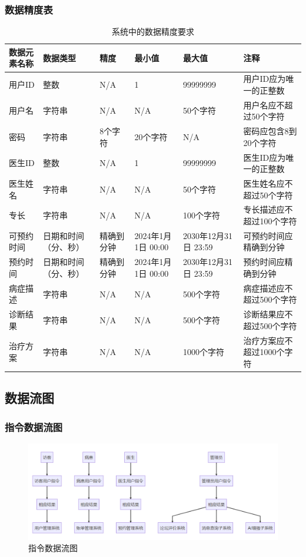\subsubsection{数据精度表}
\begin{table}[htbp]
	\centering
	\begin{tabular}{|l|p{2cm}|p{2cm}|p{2cm}|p{2cm}|p{3cm}|}
		\hline
		\textbf{数据元素名称} & \textbf{数据类型} & \textbf{精度} & \textbf{最小值} & \textbf{最大值} & \textbf{注释} \\
		\hline
		用户ID & 整数 & N/A & 1 & 99999999 & 用户ID应为唯一的正整数 \\
		用户名 & 字符串 & N/A & N/A & 50个字符 & 用户名应不超过50个字符 \\
		密码 & 字符串 & 8个字符 & 20个字符 & N/A & 密码应包含8到20个字符 \\
		医生ID & 整数 & N/A & 1 & 99999999 & 医生ID应为唯一的正整数 \\
		医生姓名 & 字符串 & N/A & N/A & 50个字符 & 医生姓名应不超过50个字符 \\
		专长 & 字符串 & N/A & N/A & 100个字符 & 专长描述应不超过100个字符 \\
		可预约时间 & 日期和时间（分、秒） & 精确到分钟 & 2024年1月1日 00:00 & 2030年12月31日 23:59 & 可预约时间应精确到分钟 \\
		预约时间 & 日期和时间（分、秒） & 精确到分钟 & 2024年1月1日 00:00 & 2030年12月31日 23:59 & 预约时间应精确到分钟 \\
		病症描述 & 字符串 & N/A & N/A & 500个字符 & 病症描述应不超过500个字符 \\
		诊断结果 & 字符串 & N/A & N/A & 500个字符 & 诊断结果应不超过500个字符 \\
		治疗方案 & 字符串 & N/A & N/A & 1000个字符 & 治疗方案应不超过1000个字符 \\
		\hline
	\end{tabular}
	\caption{系统中的数据精度要求}
	\label{tab:data_precision}
\end{table}
\newpage

\subsection{数据流图}
\subsubsection{指令数据流图}
\begin{figure}[htbp]
	\centering
	\includegraphics[width=\textwidth]{figures/08.png}
	\caption{指令数据流图}
\end{figure}

